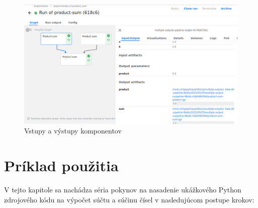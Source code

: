 \begin{figure}[!h]
    \centering
    \includegraphics[width=1\linewidth]{figures/11.png}
    \caption{Vstupy a výstupy komponentov}
    \label{run}
\end{figure}

\section{Príklad použitia}

V tejto kapitole sa nachádza séria pokynov na nasadenie ukážkového Python zdrojového kódu na výpočet súčtu a súčinu čísel v nasledujúcom postupe krokov:


